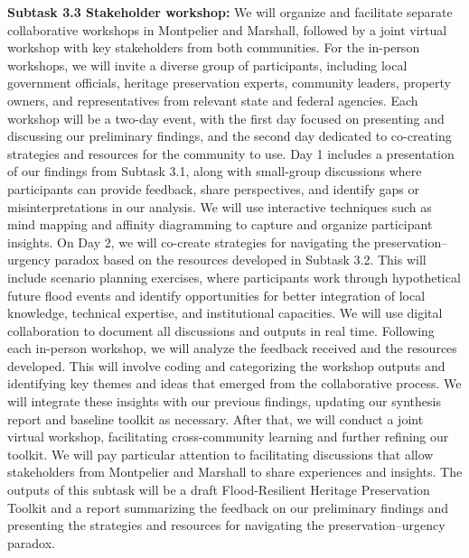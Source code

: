 \documentclass[11pt]{article}
\begin{document}
\textbf{Subtask 3.3 Stakeholder workshop:} 
We will organize and facilitate separate collaborative workshops in Montpelier and Marshall, followed by a joint virtual workshop with key stakeholders from both communities. 
For the in-person workshops, we will invite a diverse group of participants, including local government officials, heritage preservation experts, community leaders, property owners, and representatives from relevant state and federal agencies. 
Each workshop will be a two-day event, with the first day focused on presenting and discussing our preliminary findings, and the second day dedicated to co-creating strategies and resources for the community to use. 
Day 1 includes a presentation of our findings from Subtask 3.1, along with small-group discussions where participants can provide feedback, share perspectives, and identify gaps or misinterpretations in our analysis. 
We will use interactive techniques such as mind mapping and affinity diagramming to capture and organize participant insights. 
On Day 2, we will co-create strategies for navigating the preservation–urgency paradox based on the resources developed in Subtask 3.2. 
This will include scenario planning exercises, where participants work through hypothetical future flood events and identify opportunities for better integration of local knowledge, technical expertise, and institutional capacities. 
We will use digital collaboration to document all discussions and outputs in real time. 
Following each in-person workshop, we will analyze the feedback received and the resources developed. 
This will involve coding and categorizing the workshop outputs and identifying key themes and ideas that emerged from the collaborative process. 
We will integrate these insights with our previous findings, updating our synthesis report and baseline toolkit as necessary. 
After that, we will conduct a joint virtual workshop, facilitating cross-community learning and further refining our toolkit. 
We will pay particular attention to facilitating discussions that allow stakeholders from Montpelier and Marshall to share experiences and insights. 
The outputs of this subtask will be a draft Flood-Resilient Heritage Preservation Toolkit and a report summarizing the feedback on our preliminary findings and presenting the strategies and resources for navigating the preservation–urgency paradox.
\end{document}
